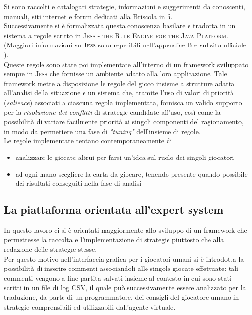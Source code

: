 Si sono raccolti e catalogati strategie, informazioni e suggerimenti da conoscenti, manuali, siti internet e forum dedicati alla Briscola in 5.\\
Successivamente si è formalizzata questa conoscenza basilare e tradotta in un sistema a regole scritto in \textsc{Jess -  the Rule Engine for the Java Platform}. (Maggiori informazioni su \textsc{Jess} sono reperibili nell'appendice B e sul sito ufficiale \cite{jess}).\\
Queste regole sono state poi implementate all'interno di un framework sviluppato sempre in \textsc{Jess} che fornisse un ambiente adatto alla loro applicazione.
Tale framework mette a disposizione le regole del gioco insieme a strutture adatta all'analisi della situazione e un sistema che, tramite l'uso di valori di priorità (\emph{salience}) associati a ciascuna regola implementata, fornisca un valido supporto per la \emph{risoluzione dei conflitti} di strategie candidate all'uso, così come la possibilità di variare facilmente priorità ai singoli componenti del ragionamento, in modo da permettere una fase di \emph{"tuning"} dell'insieme di regole.\\
Le regole implementate tentano contemporaneamente di 
\begin{itemize}
  \item analizzare le giocate altrui per farsi un'idea sul ruolo dei singoli giocatori
  \item ad ogni mano scegliere la carta da giocare, tenendo presente quando possibile dei risultati conseguiti nella fase di analisi 
\end{itemize}

\subsection{La piattaforma orientata all'expert system}
In questo lavoro ci si è orientati maggiormente allo sviluppo di un framework che permettesse la raccolta e l'implementazione di strategie piuttosto che alla redazione delle strategie stesse.\\
Per questo motivo nell'interfaccia grafica per i giocatori umani si è introdotta la possibilità di inserire commenti associandoli alle singole giocate effettuate: tali commenti vengono a fine partita salvati insieme al contesto in cui sono stati scritti in un file di log CSV, il quale può successivamente essere analizzato per la traduzione, da parte di un programmatore, dei consigli del giocatore umano in strategie comprensibili ed utilizzabili dall'agente virtuale.
